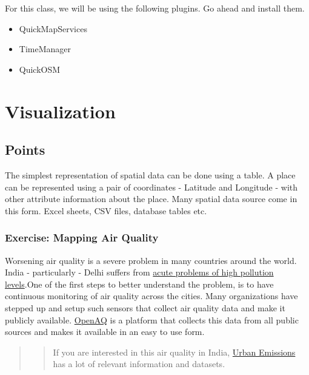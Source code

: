 \documentclass[
  12pt,
  a4paper]{article}
\providecommand{\tightlist}{%
  \setlength{\itemsep}{0pt}\setlength{\parskip}{0pt}}
\begin{document}
For this class, we will be using the following plugins. Go ahead and
install them.

\begin{itemize}
\tightlist
\item
  QuickMapServices
\item
  TimeManager
\item
  QuickOSM
\end{itemize}

\newpage

\hypertarget{visualization}{%
\section{Visualization}\label{visualization}}

\hypertarget{points}{%
\subsection{Points}\label{points}}

The simplest representation of spatial data can be done using a table. A
place can be represented using a pair of coordinates - Latitude and
Longitude - with other attribute information about the place. Many
spatial data source come in this form. Excel sheets, CSV files, database
tables etc.

\hypertarget{exercise-mapping-air-quality}{%
\subsubsection{Exercise: Mapping Air
Quality}\label{exercise-mapping-air-quality}}

Worsening air quality is a severe problem in many countries around the
world. India - particularly - Delhi suffers from
\href{https://ig.ft.com/india-pollution/}{acute problems of high
pollution levels}.One of the first steps to better understand the
problem, is to have continuous monitoring of air quality across the
cities. Many organizations have stepped up and setup such sensors that
collect air quality data and make it publicly available.
\href{https://openaq.org/}{OpenAQ} is a platform that collects this data
from all public sources and makes it available in an easy to use form.

\begin{quote}
\begin{quote}
If you are interested in this air quality in India,
\href{http://www.urbanemissions.info/}{Urban Emissions} has a lot of
relevant information and datasets.
\end{quote}
\end{quote}
\end{document}
